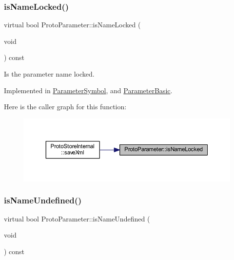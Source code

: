 \subsubsection{\texorpdfstring{isNameLocked()}{isNameLocked()}}
{\footnotesize\ttfamily virtual bool Proto\+Parameter\+::is\+Name\+Locked (\begin{DoxyParamCaption}\item[{void}]{ }\end{DoxyParamCaption}) const\hspace{0.3cm}{\ttfamily [pure virtual]}}



Is the parameter name locked. 



Implemented in \mbox{\hyperlink{class_parameter_symbol_aeadfb7be82e97a45d3f7bc661ce09bea}{Parameter\+Symbol}}, and \mbox{\hyperlink{class_parameter_basic_a5356f1c78cedff7576c3cd5d04c3ae91}{Parameter\+Basic}}.

Here is the caller graph for this function\+:
\nopagebreak
\begin{figure}[H]
\begin{center}
\leavevmode
\includegraphics[width=350pt]{class_proto_parameter_ae8d61607d66c96ac0fc9e0e6b7a100f1_icgraph}
\end{center}
\end{figure}
\mbox{\label{class_proto_parameter_a62d78489a16faff7cff6db6a1cf2593f}} 
\subsubsection{\texorpdfstring{isNameUndefined()}{isNameUndefined()}}
{\footnotesize\ttfamily virtual bool Proto\+Parameter\+::is\+Name\+Undefined (\begin{DoxyParamCaption}\item[{void}]{ }\end{DoxyParamCaption}) const\hspace{0.3cm}{\ttfamily [pure virtual]}}



